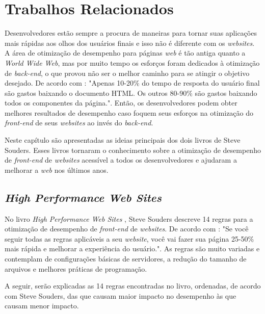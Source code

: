 %
%

\chapter{Trabalhos Relacionados}
Desenvolvedores estão sempre a procura de maneiras para tornar suas aplicações mais rápidas aos olhos dos usuários finais e isso não é diferente com os \textit{websites}. A área de otimização de desempenho para páginas \textit{web} é tão antiga quanto a \textit{World Wide Web}, mas por muito tempo os esforços foram dedicados à otimização de \textit{back-end}, o que  provou não ser o melhor caminho para se atingir o objetivo desejado. De acordo com : "Apenas 10-20\% do tempo de resposta do usuário final são gastos baixando o documento HTML. Os outros 80-90\% são gastos baixando todos os componentes da página.". Então, os desenvolvedores podem obter melhores resultados de desempenho caso foquem seus esforços na otimização do \textit{front-end} de seus \textit{websites} ao invés do \textit{back-end}.

Neste capítulo são apresentadas as ideias principais dos dois livros  de Steve Souders. Esses livros tornaram o conhecimento sobre a otimização de desempenho de \textit{front-end} de \textit{websites} acessível a todos os desenvolvedores e ajudaram a melhorar a \textit{web} nos últimos anos.

\section{\textit{High Performance Web Sites}}
\label{sec:highperformancewebsites}

No livro \textit{High Performance Web Sites} \cite{HighPerformance}, Steve Souders descreve 14 regras para a otimização de desempenho de \textit{front-end} de \textit{websites}. De acordo com : "Se você seguir todas as regras aplicáveis a seu \textit{website}, você vai fazer sua página 25-50\% mais rápida e melhorar a experiência do usuário.". As regras são muito variadas e contemplam de configurações básicas de servidores, a redução do tamanho de arquivos e melhores práticas de programação.

A seguir, serão explicadas as 14 regras encontradas no livro, ordenadas, de acordo com Steve Souders, das que causam maior impacto no desempenho às que causam menor impacto.


